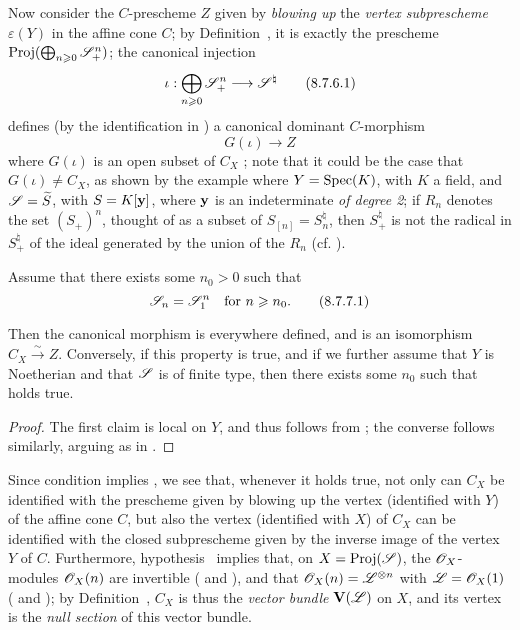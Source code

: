 \begin{env}[8.7.6]
\label{II.8.7.6}
Now consider the $C$-prescheme $Z$ given by \emph{blowing up} the \emph{vertex subprescheme $\varepsilon(Y)$} in the affine cone $C$;
by Definition~, it is exactly the prescheme $\operatorname{Proj}(\bigoplus_{n\geqslant0}\mathscr{S}_+^n)$;
the canonical injection
\[
\label{II.8.7.6.1}
  \iota: \bigoplus_{n\geq0} \sh{S}_+^n \to \sh{S}^\natural
\tag{8.7.6.1}
\]
defines (by the identification in ) a canonical dominant $C$-morphism
\[
\label{II.8.7.6.2}
  G(\iota)\to Z
  \tag{8.7.6.2}
\]
where $G(\iota)$ is an open subset of $C_X$ ;
note that it could be the case that $G(\iota)\neq C_X$, as shown by the example where $Y=\operatorname{Spec}(K)$, with $K$ a field, and $\mathscr{S}=\widetilde{S}$, with $S=K[\mathbf{y}]$, where $\mathbf{y}$ is an indeterminate \emph{of degree 2};
if $R_n$ denotes the set $(S_+)^n$, thought of as a subset of $S_{[n]}=S_n^\natural$, then $S_+^\natural$ is not the radical in $S_+^\natural$ of the ideal generated by the union of the $R_n$ (cf. ).
\end{env}

\begin{corollary}[8.7.7]
\label{II.8.7.7}
Assume that there exists some $n_0>0$ such that
\[
\label{II.8.7.7.1}
  \mathscr{S}_n=\mathscr{S}_1^n
  \quad
  \text{for }n\geqslant n_0.
  \tag{8.7.7.1}
\]

Then the canonical morphism  is everywhere defined, and is an isomorphism $C_X\xrightarrow{\sim}Z$.
Conversely, if this property is true, and if we further assume that $Y$ is Noetherian and that $\mathscr{S}$ is of finite type, then there exists some $n_0$ such that  holds true.
\end{corollary}

\begin{proof}
\label{II.8.7.7}
The first claim is local on $Y$, and thus follows from ;
the converse follows similarly, arguing as in .
\end{proof}

\begin{remark}[8.7.8]
\label{II.8.7.8}
Since condition  implies , we see that, whenever it holds true, not only can $C_X$ be identified with the prescheme given by blowing up the vertex (identified with $Y$) of the affine cone $C$, but also the vertex (identified with $X$) of $C_X$ can be identified with the closed subprescheme given by the inverse image of the vertex $Y$ of $C$.
Furthermore, hypothesis~ implies that, on $X=\operatorname{Proj}(\mathscr{S})$, the $\mathscr{O}_X$-modules $\mathscr{O}_X(n)$ are invertible ( and ), and that $\mathscr{O}_X(n)=\mathscr{L}^{\otimes n}$ with $\mathscr{L}=\mathscr{O}_X(1)$ ( and );
by Definition~, $C_X$ is thus the \emph{vector bundle} $\mathbf{V}(\mathscr{L})$ on $X$, and its vertex is the \emph{null section} of this vector bundle.
\end{remark}

